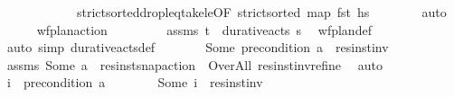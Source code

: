 \begin{isabellebody}
\ \ \ \ \ \ \ \ \ \ \ \ strict{\isacharunderscore}{\kern0pt}sorted{\isacharunderscore}{\kern0pt}drop{\isacharunderscore}{\kern0pt}leq{\isacharunderscore}{\kern0pt}take{\isacharunderscore}{\kern0pt}le{\isacharprime}{\kern0pt}{\isacharbrackleft}{\kern0pt}OF\ {\isacartoucheopen}strict{\isacharunderscore}{\kern0pt}sorted\ {\isacharparenleft}{\kern0pt}map\ fst\ hs{\isacharparenright}{\kern0pt}{\isacartoucheclose}{\isacharbrackright}{\kern0pt}\isanewline
\ \ \ \ \ \ \isamarkupfalse%
\ auto\isanewline
\ \ \ \ \isamarkupfalse%
\ {\isachardoublequoteopen}wf{\isacharunderscore}{\kern0pt}plan{\isacharunderscore}{\kern0pt}action\ {\isasympi}{\isachardoublequoteclose}\isanewline
\ \ \ \ \ \ \isamarkupfalse%
\ assms\ {\isacartoucheopen}{\isacharparenleft}{\kern0pt}t\isactrlsub {\isasympi}{\isacharcomma}{\kern0pt}{\isasympi}{\isacharparenright}{\kern0pt}\ {\isasymin}\ durative{\isacharunderscore}{\kern0pt}acts\ {\isasympi}s{\isacartoucheclose}\ \isamarkupfalse%
\ wf{\isacharunderscore}{\kern0pt}plan{\isacharunderscore}{\kern0pt}def\ \isanewline
\ \ \ \ \ \ \isamarkupfalse%
\ {\isacharparenleft}{\kern0pt}auto\ simp{\isacharcolon}{\kern0pt}\ durative{\isacharunderscore}{\kern0pt}acts{\isacharunderscore}{\kern0pt}def{\isacharparenright}{\kern0pt}\isanewline
\ \ \ \ \isamarkupfalse%
\ \isamarkupfalse%
\ {\isachardoublequoteopen}Some\ {\isacharparenleft}{\kern0pt}precondition\ a{\isacharparenright}{\kern0pt}\ {\isacharequal}{\kern0pt}\ res{\isacharunderscore}{\kern0pt}inst{\isacharunderscore}{\kern0pt}inv\ {\isasympi}{\isachardoublequoteclose}\isanewline
\ \ \ \ \ \ \isamarkupfalse%
\ assms\ {\isacartoucheopen}Some\ a\ {\isacharequal}{\kern0pt}\ res{\isacharunderscore}{\kern0pt}inst{\isacharunderscore}{\kern0pt}snap{\isacharunderscore}{\kern0pt}action\ {\isasympi}\ Over{\isacharunderscore}{\kern0pt}All{\isacartoucheclose}\ res{\isacharunderscore}{\kern0pt}inst{\isacharunderscore}{\kern0pt}inv{\isacharunderscore}{\kern0pt}refine\ \isamarkupfalse%
\ auto\isanewline
\ \ \ \ \isamarkupfalse%
\ \isamarkupfalse%
\ {\isachardoublequoteopen}i\ {\isacharequal}{\kern0pt}\ precondition\ a{\isachardoublequoteclose}\isanewline
\ \ \ \ \ \ \isamarkupfalse%
\ {\isacartoucheopen}Some\ i\ {\isacharequal}{\kern0pt}\ res{\isacharunderscore}{\kern0pt}inst{\isacharunderscore}{\kern0pt}inv\ {\isasympi}{\isacartoucheclose}\isanewline
\ \ \ \ \ \ \isamarkupfalse%

\end{isabellebody}
